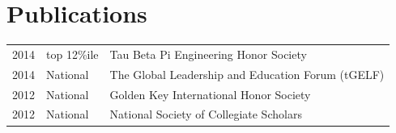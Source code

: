 \documentclass[letterpaper]{soragna-onepage-twocols} %
\begin{document}
\begin{minipage}[t]{0.66\textwidth}
\sectionspace %


\section{Publications} 

\begin{tabular}{rll}
2014 & top 12\%ile & Tau Beta Pi Engineering Honor Society\\
2014 & National & The Global Leadership and Education Forum (tGELF)\\
2012 & National & Golden Key International Honor Society\\
2012 & National & National Society of Collegiate Scholars\\
\end{tabular}

\sectionspace %


\end{minipage} %








\end{document}
